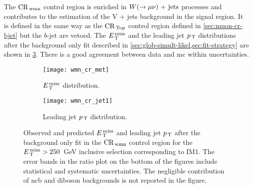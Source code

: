The $\mathrm{CR}_\mathrm{\, wmn}$ control region is enriched in $W (\rightarrow \mu \nu)\mathrm{~+~jets}$ processes and
contributes to the estimation of the V + jets background in the signal
region. It is defined in the same way as the $\mathrm{CR}_\mathrm{\, Top}$ control region defined in
\cref{sec:muon-cr-bjet} but the $b$-jet are vetoed. The $E_\mathrm{\, T}^\mathrm{\, miss}$ and the leading
jet $p_\mathrm{\, T}$ distributions after the background only fit described in
\cref{sec:glob-simult-likel,sec:fit-strategy} are shown in
\cref{fig:wmn_plots}. There is a good agreement between data and \gls{mc} within
uncertainties.
\begin{figure}[!th]
  \centering
  \begin{subfigure}[t]{.48\linewidth}
    \texttt{[image: wmn\_cr\_met]}
    \caption{$E_\mathrm{\, T}^\mathrm{\, miss}$ distribution.}
    \label{fig:wmn_cr_et_miss}
  \end{subfigure}
  \begin{subfigure}[t]{.48\linewidth}
    \texttt{[image: wmn\_cr\_jet1]}
    \caption{Leading jet $p_\mathrm{\, T}$ distribution.}
    \label{fig:wmn_cr_jet1}
  \end{subfigure}
  \caption{Observed and predicted $E_\mathrm{\, T}^\mathrm{\, miss}$ and leading jet $p_\mathrm{\, T}$ after the
    background only fit in the $\mathrm{CR}_\mathrm{\, wmn}$ control region for the $E_\mathrm{\, T}^\mathrm{\, miss} > 250$~GeV
    inclusive selection corresponding to IM1. The error bands in the ratio plot
    on the bottom of the figures include statistical and systematic
    uncertainties. The negligible contribution of \gls{ncb} and diboson
    backgrounds is not reported in the figure.}
  \label{fig:wmn_plots}
\end{figure}
